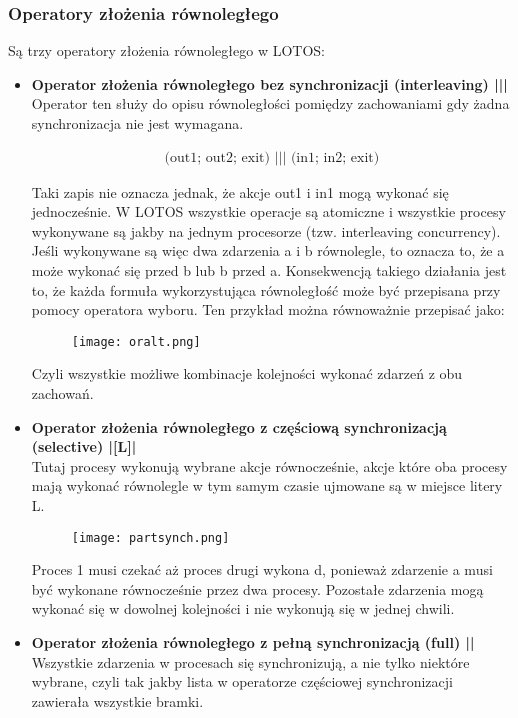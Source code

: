 \documentclass[a4paper,15pt]{article}
\newcommand{\example}[2]{
    \begin{tcolorbox}[colback=blue!5!white,colframe=blue,title={Przykład #1}]
        #2
    \end{tcolorbox}
}
\begin{document}
\subsubsection{Operatory złożenia równoległego}
Są trzy operatory złożenia równoległego w LOTOS:
\begin{itemize}
\item \textbf{Operator złożenia równoległego bez synchronizacji (interleaving) |||} \\
Operator ten służy do opisu równoległości pomiędzy zachowaniami gdy żadna synchronizacja nie jest wymagana. 
\example{}{
\begin{align*}
\text{(out1; out2; exit) ||| (in1; in2; exit)}
\end{align*}
}
Taki zapis nie oznacza jednak, że akcje out1 i in1 mogą wykonać się jednocześnie. W LOTOS wszystkie operacje są atomiczne i wszystkie procesy wykonywane są jakby na jednym procesorze (tzw. interleaving concurrency). \\ Jeśli wykonywane są więc dwa zdarzenia a i b równolegle, to oznacza to, że a może wykonać się przed b lub b przed a. Konsekwencją takiego działania jest to, że każda formuła wykorzystująca równoległość może być przepisana przy pomocy operatora wyboru. Ten przykład można równoważnie przepisać jako:
\example{}{
\begin{figure}[H]
\centerline{\texttt{[image: oralt.png]}}
\label{fig:oralt}
\end{figure}
Czyli wszystkie możliwe kombinacje kolejności wykonać zdarzeń z obu zachowań.
}


\newpage
\item \textbf{Operator złożenia równoległego z częściową synchronizacją (selective) |[L]| } \\
Tutaj procesy wykonują wybrane akcje równocześnie, akcje które oba procesy mają wykonać równolegle w tym samym czasie ujmowane są w miejsce litery L.
\example{}{
\begin{figure}[H]
\centerline{\texttt{[image: partsynch.png]}}
\label{fig:partsynch}
\end{figure}
Proces 1 musi czekać aż proces drugi wykona d, ponieważ zdarzenie a musi być wykonane równocześnie przez dwa procesy. Pozostałe zdarzenia mogą wykonać się w dowolnej kolejności i nie wykonują się w jednej chwili. 
}



\item \textbf{Operator złożenia równoległego z pełną synchronizacją (full) || } \\
Wszystkie zdarzenia w procesach się synchronizują, a nie tylko niektóre wybrane, czyli tak jakby lista w operatorze częściowej synchronizacji zawierała wszystkie bramki.
\end{itemize} 
\end{document}
